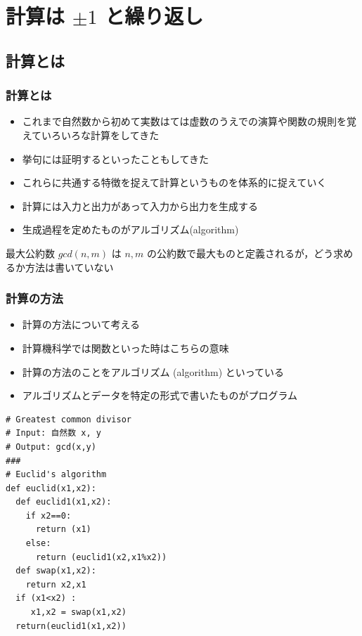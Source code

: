 \section{計算は \(\pm 1\) と繰り返し}
\subsection{計算とは}
\begin{frame}
\frametitle{計算とは}
  \begin{itemize}
\item これまで自然数から初めて実数はては虚数のうえでの演算や関数の規則を覚えていろいろな計算をしてきた
\item 挙句には証明するといったこともしてきた
\item これらに共通する特徴を捉えて計算というものを体系的に捉えていく
\item 計算には入力と出力があって入力から出力を生成する
\item 生成過程を定めたものがアルゴリズム(algorithm)
  \end{itemize}
  \begin{example}[最大公約数]
最大公約数 \(gcd(n,m)\) は \(n, m\) の公約数で最大ものと定義されるが，どう求めるか方法は書いていない
  \end{example}
\end{frame}
\begin{frame}
\frametitle{計算の方法}
  \begin{itemize}
\item 計算の方法について考える
\item 計算機科学では関数といった時はこちらの意味
\item 計算の方法のことをアルゴリズム (algorithm) といっている
\item アルゴリズムとデータを特定の形式で書いたものがプログラム
  \end{itemize}
  \begin{lstlisting}[caption={gcd.py}]
# Greatest common divisor
# Input: 自然数 x, y
# Output: gcd(x,y)
###
# Euclid's algorithm
def euclid(x1,x2):
  def euclid1(x1,x2):
    if x2==0:
      return (x1)
    else:
      return (euclid1(x2,x1%x2))
  def swap(x1,x2):
    return x2,x1
  if (x1<x2) :
     x1,x2 = swap(x1,x2)
  return(euclid1(x1,x2))
  \end{lstlisting}
\end{frame}
